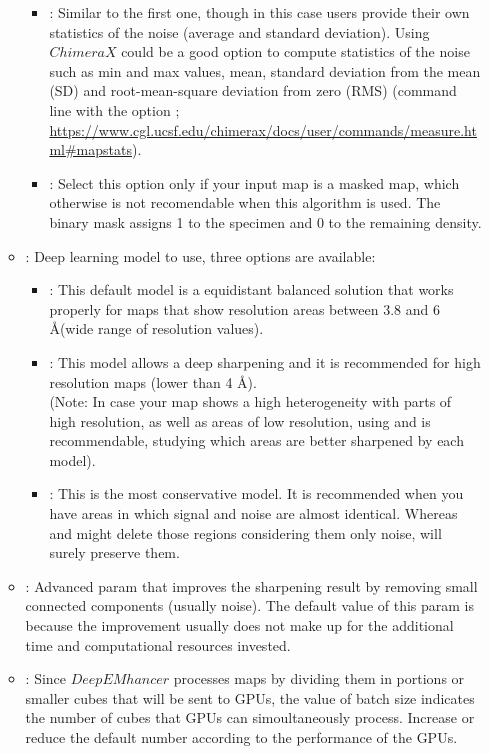 \begin{itemize}
\begin{itemize}
\begin{itemize}
            \item {}: Similar to the first one, though in this case users provide their own statistics of the noise (average and standard deviation). Using $ChimeraX$ could be a good option to compute statistics of the noise such as min and max values, mean, standard deviation from the mean (SD) and root-mean-square deviation from zero (RMS) (command line  with the option ; \url{https://www.cgl.ucsf.edu/chimerax/docs/user/commands/measure.html#mapstats}).   
            \item {}: Select this option only if your input map is a masked map, which otherwise is not recomendable when this algorithm is used. The binary mask assigns 1 to the specimen and 0 to the remaining density.
        \end{itemize}
        \item {}: Deep learning model to use, three options are available:
         \begin{itemize}
            \item {}: This default model is a equidistant balanced solution that works properly for maps that show resolution areas between 3.8 and 6  \AA  (wide range of resolution values).
            \item {}: This model allows a deep sharpening and it is recommended for high resolution maps (lower than 4  \AA).\\
            (Note: In case your map shows a high heterogeneity with parts of high resolution, as well as areas of low resolution, using  and  is recommendable, studying which areas are better sharpened by each model).
            \item {}: This is the most conservative model. It is recommended when you have areas in which signal and noise are almost identical. Whereas  and  might delete those regions considering them only noise,  will surely preserve them.
         \end{itemize}
        \item {}: Advanced param that improves the sharpening result by removing small connected components (usually noise). The default value of this param is  because the improvement usually does not make up for the additional time and computational resources invested.
        \item {}: Since $DeepEMhancer$ processes maps by dividing them in portions or smaller cubes that will be sent to GPUs, the value of batch size indicates the number of cubes that GPUs can simoultaneously process. Increase or reduce the default number according to the performance of the GPUs.
    \end{itemize}
    

\end{itemize}
